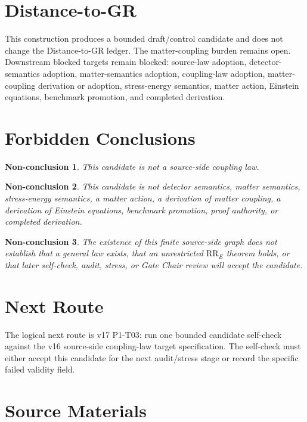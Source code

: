 \documentclass[11pt]{article}
\newtheorem{nonconclusion}{Non-conclusion}
\begin{document}
\section{Distance-to-GR}

This construction produces a bounded draft/control candidate and does not
change the Distance-to-GR ledger. The matter-coupling burden remains open.
Downstream blocked targets remain blocked: source-law adoption,
detector-semantics adoption, matter-semantics adoption, coupling-law adoption,
matter-coupling derivation or adoption, stress-energy semantics, matter
action, Einstein equations, benchmark promotion, and completed derivation.

\section{Forbidden Conclusions}

\begin{nonconclusion}
This candidate is not a source-side coupling law.
\end{nonconclusion}

\begin{nonconclusion}
This candidate is not detector semantics, matter semantics, stress-energy
semantics, a matter action, a derivation of matter coupling, a derivation of
Einstein equations, benchmark promotion, proof authority, or completed
derivation.
\end{nonconclusion}

\begin{nonconclusion}
The existence of this finite source-side graph does not establish that a
general law exists, that an unrestricted \(\mathrm{RR}_E\) theorem holds, or
that later self-check, audit, stress, or Gate Chair review will accept the
candidate.
\end{nonconclusion}

\section{Next Route}

The logical next route is v17 P1-T03: run one bounded candidate self-check
against the v16 source-side coupling-law target specification. The self-check
must either accept this candidate for the next audit/stress stage or record the
specific failed validity field.

\section{Source Materials}
\end{document}
